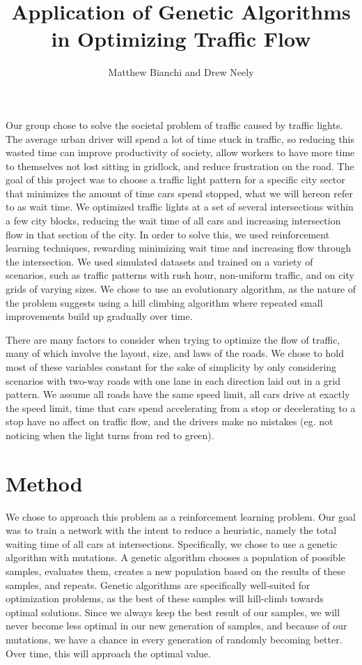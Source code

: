 \documentclass[12pt, letterpaper]{article}
\title{Application of Genetic Algorithms in Optimizing Traffic Flow}
\author{Matthew Bianchi and Drew Neely}
\begin{document}
\maketitle

Our group chose to solve the societal problem of traffic caused by traffic lights. 
The average urban driver will spend a lot of time stuck in traffic, so reducing this wasted time can improve productivity of society, allow workers to have more time to themselves not lost sitting in gridlock, and reduce frustration on the road.
The goal of this project was to choose a traffic light pattern for a specific city sector that minimizes the amount of time cars spend stopped, what we will hereon refer to as wait time.
We optimized traffic lights at a set of several intersections within a few city blocks, reducing the wait time of all cars and increasing intersection flow in that section of the city. 
In order to solve this, we used reinforcement learning techniques, rewarding minimizing wait time and increasing flow through the intersection. 
We used simulated datasets and trained on a variety of scenarios, such as traffic patterns with rush hour, non-uniform traffic, and on city grids of varying sizes. 
We chose to use an evolutionary algorithm, as the nature of the problem suggests using a hill climbing algorithm where repeated small improvements build up gradually over time. 

There are many factors to consider when trying to optimize the flow of traffic, many of which involve the layout, size, and laws of the roads.
We chose to hold most of these variables constant for the sake of simplicity by only considering scenarios with two-way roads with one lane in each direction laid out in a grid pattern. 
We assume all roads have the same speed limit, all cars drive at exactly the speed limit, time that cars spend accelerating from a stop or decelerating to a stop have no affect on traffic flow, and the drivers make no mistakes (eg. not noticing when the light turns from red to green).

\section*{Method}

We chose to approach this problem as a reinforcement learning problem.
Our goal was to train a network with the intent to reduce a heuristic, namely the total waiting time of all cars at intersections.
Specifically, we chose to use a genetic algorithm with mutations.
A genetic algorithm chooses a population of possible samples, evaluates them, creates a new population based on the results of these samples, and repeats.
Genetic algorithms are specifically well-suited for optimization problems, as the best of these samples will hill-climb towards optimal solutions.
Since we always keep the best result of our samples, we will never become less optimal in our new generation of samples, and because of our mutations, we have a chance in every generation of randomly becoming better.
Over time, this will approach the optimal value.
\end{document}
